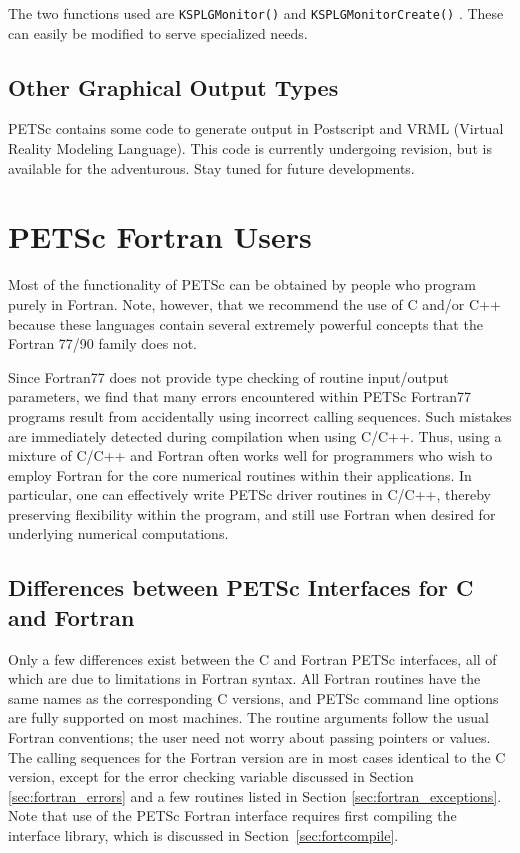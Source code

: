 The two functions used are {\tt KSPLGMonitor()} 
and {\tt KSPLGMonitorCreate()}  . These 
can easily be modified to serve specialized needs.

\section{Other Graphical Output Types}
PETSc contains some code to generate output in Postscript and VRML (Virtual
Reality Modeling Language).  This code is currently undergoing revision, but
is available for the adventurous.  Stay tuned for future developments.

\chapter{PETSc Fortran Users}
\label{ch:fortran}

Most of the functionality of PETSc can be obtained by people who
program purely in Fortran.  Note, however, that we recommend the
use of C and/or C++ because these languages contain several extremely powerful
concepts that the Fortran 77/90 family does not. 

Since Fortran77 does not provide type checking of routine input/output
parameters, we find that many errors encountered within PETSc Fortran77
programs result from accidentally using incorrect calling sequences.
Such mistakes are immediately detected during compilation when using
C/C++.  Thus, using a mixture of C/C++ and Fortran often works well
for programmers who wish to employ Fortran for the core numerical
routines within their applications.  In particular, one can
effectively write PETSc driver routines in C/C++, thereby preserving
flexibility within the program, and still use Fortran when desired for
underlying numerical computations.

\section{Differences between PETSc Interfaces for C and Fortran}

Only a few differences exist between the C and Fortran PETSc
interfaces, all of which are due to limitations in Fortran syntax.
All Fortran routines have the same names as the corresponding C
versions, and PETSc command line options are fully supported on most 
machines.  The
routine arguments follow the usual Fortran conventions; the user need
not worry about passing pointers or values.  The calling sequences
for the Fortran version are in most cases identical to the C version,
except for the error checking variable discussed in 
Section \ref{sec:fortran_errors} and a few routines listed in 
Section \ref{sec:fortran_exceptions}.
Note that use of the PETSc Fortran interface requires first compiling
the interface library, which is discussed in Section~\ref{sec:fortcompile}.

